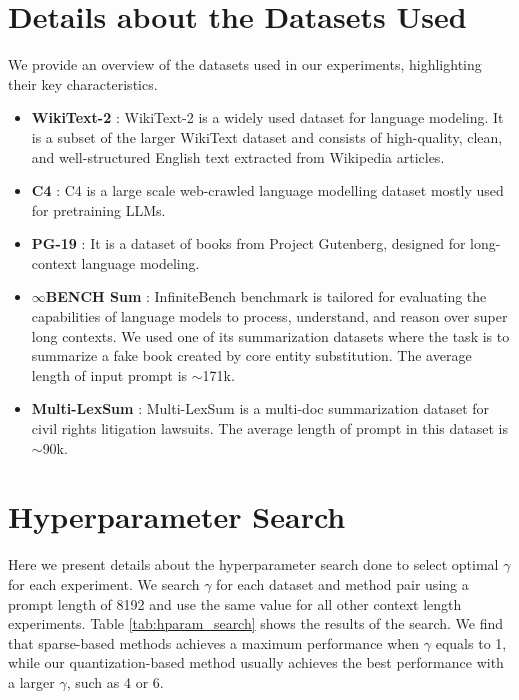 \section{Details about the Datasets Used}
\label{appendix:datasets}
We provide an overview of the datasets used in our experiments, highlighting their key characteristics.

\begin{itemize}
    \item \textbf{WikiText-2} \cite{merity2016pointer}: WikiText-2 is a widely used dataset for language modeling. It is a subset of the larger WikiText dataset and consists of high-quality, clean, and well-structured English text extracted from Wikipedia articles. 
    \item \textbf{C4} \cite{raffel2020exploring}: C4 is a large scale web-crawled language modelling dataset mostly used for pretraining LLMs.
    \item \textbf{PG-19} \cite{raecompressive2019pg19}: It is a dataset of books from Project Gutenberg, designed for long-context language modeling.
    \item \textbf{$\infty$B{\scriptsize ENCH} Sum} \cite{zhang2024inftybenchextendinglongcontext}: InfiniteBench benchmark is tailored for evaluating the capabilities of language models to process, understand, and reason over super long contexts. We used one of its summarization datasets where the task is to summarize a fake book created by core entity substitution. The average length of input prompt is $\sim$171k.
    \item \textbf{Multi-LexSum} \cite{shen2022multilexsum}: Multi-LexSum is a multi-doc summarization dataset for civil rights litigation lawsuits. The average length of prompt in this dataset is $\sim$90k.
\end{itemize}


\section{Hyperparameter Search}\label{appendix:hparam_search}
Here we present details about the hyperparameter search done to select optimal $\gamma$ for each experiment. We search $\gamma$ for each dataset and method pair using a prompt length of 8192 and use the same value for all other context length experiments. Table \ref{tab:hparam_search} shows the results of the search. We find that sparse-based methods achieves a maximum performance when $\gamma$ equals to 1, while our quantization-based method usually achieves the best performance with a larger $\gamma$, such as 4 or 6.

